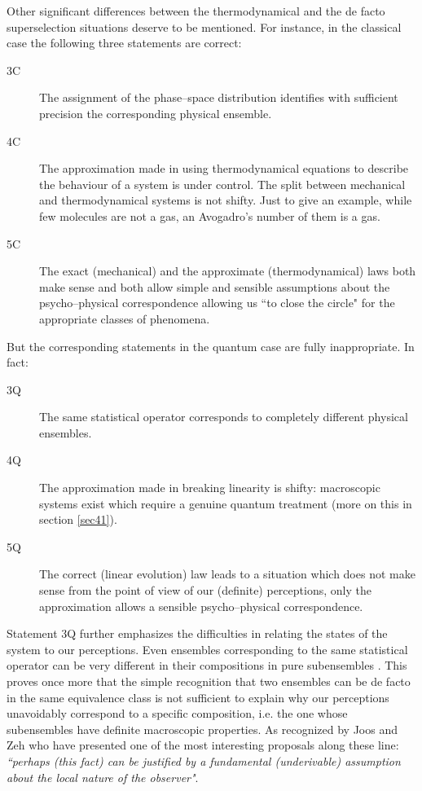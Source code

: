 \documentclass[12pt]{article}
\begin{document}
Other significant differences between the thermodynamical and the
de facto superselection situations deserve to be mentioned. For
instance, in the classical case the following three statements are
correct:
\begin{description}
\item[3C] The assignment of the phase--space distribution identifies
with sufficient precision the corresponding physical ensemble.
\item[4C] The approximation made in using thermodynamical equations
to describe the behaviour of a system is under control. The split
between mechanical and thermodynamical systems is not shifty. Just
to give an example, while few molecules are not a gas, an
Avogadro's number of them is a gas.
\item[5C] The exact (mechanical) and the approximate
(thermodynamical) laws both make sense and both allow simple and
sensible assumptions about the psycho--physical correspondence
allowing us ``to close the circle" for the appropriate classes of
phenomena.
\end{description}
But the corresponding statements in the quantum case are fully
inappropriate. In fact:
\begin{description}
\item[3Q] The same statistical operator corresponds to completely
different physical ensembles.
\item[4Q] The approximation made in breaking linearity is shifty:
macroscopic systems exist which require a genuine quantum
treatment (more on this in section \ref{sec41}).
\item[5Q] The correct (linear evolution) law leads to a situation
which does not make sense from the point of view of our (definite)
perceptions, only the approximation allows a sensible
psycho--physical correspondence.
\end{description}
Statement 3Q further emphasizes the difficulties in relating the
states of the system to our perceptions. Even ensembles
corresponding to the same statistical operator can be very
different in their compositions in pure subensembles \cite{bcas}.
This proves once more that the simple recognition that two
ensembles can be de facto in the same equivalence class is not
sufficient to explain why our perceptions unavoidably correspond
to a specific composition, i.e. the one whose subensembles have
definite macroscopic properties. As recognized by Joos and Zeh
\cite{jz} who have presented one of the most interesting proposals
along these line: {\it ``perhaps (this fact) can be justified by a
fundamental (underivable) assumption about the local nature of the
observer"}.
\end{document}
